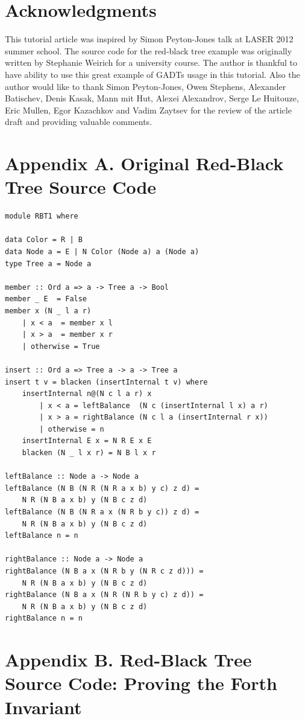 \documentclass{tmr}
\begin{document}
\section*{Acknowledgments}

This tutorial article was inspired by Simon Peyton-Jones talk at LASER 2012 summer school. The source code for the red-black tree example was originally written by Stephanie Weirich for a university course. The author is thankful to have ability to use this great example of GADTs usage in this tutorial. Also the author would like to thank Simon Peyton-Jones, Owen Stephens, Alexander Batischev, Denis Kasak, Mann mit Hut, Alexei Alexandrov, Serge Le Huitouze, Eric Mullen, Egor Kazachkov and Vadim Zaytsev for the review of the article draft and providing valuable comments.



\section*{Appendix A. Original Red-Black Tree Source Code}
\label{sec:appendix_a}

\begin{Verbatim}
module RBT1 where

data Color = R | B
data Node a = E | N Color (Node a) a (Node a) 
type Tree a = Node a

member :: Ord a => a -> Tree a -> Bool
member _ E  = False
member x (N _ l a r)
    | x < a  = member x l
    | x > a  = member x r
    | otherwise = True

insert :: Ord a => Tree a -> a -> Tree a
insert t v = blacken (insertInternal t v) where
    insertInternal n@(N c l a r) x
        | x < a = leftBalance  (N c (insertInternal l x) a r)
        | x > a = rightBalance (N c l a (insertInternal r x))
        | otherwise = n
    insertInternal E x = N R E x E
    blacken (N _ l x r) = N B l x r

leftBalance :: Node a -> Node a
leftBalance (N B (N R (N R a x b) y c) z d) =
    N R (N B a x b) y (N B c z d)
leftBalance (N B (N R a x (N R b y c)) z d) =
    N R (N B a x b) y (N B c z d)
leftBalance n = n

rightBalance :: Node a -> Node a
rightBalance (N B a x (N R b y (N R c z d))) =
    N R (N B a x b) y (N B c z d)
rightBalance (N B a x (N R (N R b y c) z d)) =
    N R (N B a x b) y (N B c z d)
rightBalance n = n
\end{Verbatim}

\section*{Appendix B. Red-Black Tree Source Code: Proving the Forth Invariant}
\label{sec:appendix_b}
\end{document}
